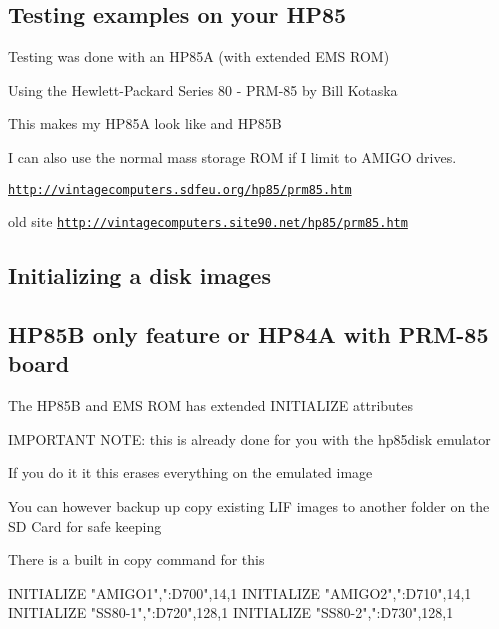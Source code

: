 \subsection*{Testing examples on your H\+P85}


\begin{DoxyItemize}
\item Testing was done with an H\+P85A (with extended E\+MS R\+OM)
\begin{DoxyItemize}
\item Using the Hewlett-\/\+Packard Series 80 -\/ P\+R\+M-\/85 by Bill Kotaska
\item This makes my H\+P85A look like and H\+P85B
\begin{DoxyItemize}
\item I can also use the normal mass storage R\+OM if I limit to A\+M\+I\+GO drives.
\item \href{http://vintagecomputers.sdfeu.org/hp85/prm85.htm}{\tt http\+://vintagecomputers.\+sdfeu.\+org/hp85/prm85.\+htm}
\begin{DoxyItemize}
\item old site \href{http://vintagecomputers.site90.net/hp85/prm85.htm}{\tt http\+://vintagecomputers.\+site90.\+net/hp85/prm85.\+htm}
\end{DoxyItemize}
\end{DoxyItemize}
\end{DoxyItemize}
\end{DoxyItemize}

\subsection*{Initializing a disk images}

\subsection*{H\+P85B only feature or H\+P84A with P\+R\+M-\/85 board}


\begin{DoxyItemize}
\item The H\+P85B and E\+MS R\+OM has extended I\+N\+I\+T\+I\+A\+L\+I\+ZE attributes
\item I\+M\+P\+O\+R\+T\+A\+NT N\+O\+TE\+: this is already done for you with the hp85disk emulator
\begin{DoxyItemize}
\item If you do it it this erases everything on the emulated image
\item You can however backup up copy existing L\+IF images to another folder on the SD Card for safe keeping
\begin{DoxyItemize}
\item There is a built in copy command for this 
\begin{DoxyPre}
  INITIALIZE "AMIGO1",":D700",14,1
  INITIALIZE "AMIGO2",":D710",14,1
  INITIALIZE "SS80-1",":D720",128,1
  INITIALIZE "SS80-2",":D730",128,1
\end{DoxyPre}

\end{DoxyItemize}
\end{DoxyItemize}
\end{DoxyItemize}

